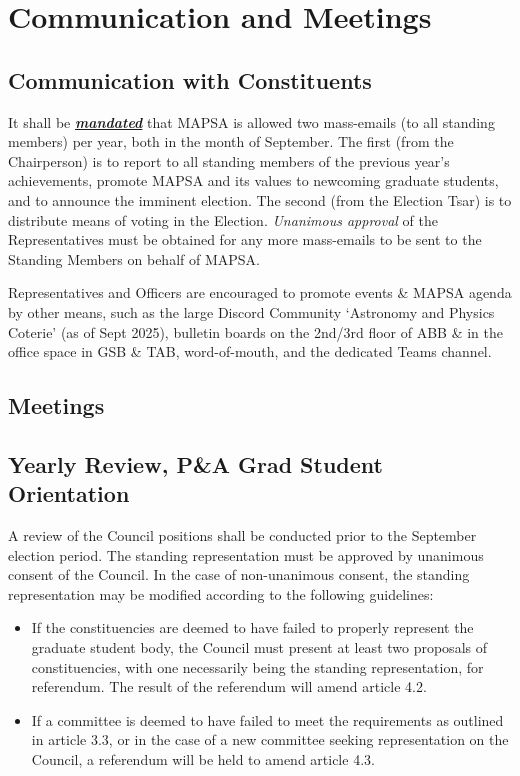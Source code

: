 \documentclass[8pt]{article}
\begin{document}
	
	\section{Communication and Meetings}
	\subsection{Communication with Constituents}
	It shall be \textbf{\textit{\underline{mandated}}} that MAPSA is allowed two mass-emails (to all standing members) per year, both in the month of September. The first (from the Chairperson) is to report to all standing members of the previous year's achievements, promote MAPSA and its values to newcoming graduate students, and to announce the imminent election. The second (from the Election Tsar) is to distribute means of voting in the Election. \textit{Unanimous approval} of the Representatives must be obtained for any more mass-emails to be sent to the Standing Members on behalf of MAPSA.
	
	Representatives and Officers are encouraged to promote events \& MAPSA agenda by other means, such as the large Discord Community `Astronomy and Physics Coterie' (as of Sept 2025), bulletin boards on the 2nd/3rd floor of ABB \& in the office space in GSB \& TAB, word-of-mouth, and the dedicated Teams channel.
	
	\subsection{Meetings}
	
	\subsection{Yearly Review, P\&A Grad Student Orientation}
	A review of the Council positions shall be conducted prior to the September election period. The standing representation must be approved by unanimous consent of the Council. In the case of non-unanimous consent, the standing representation may be modified according to the following guidelines:
	\begin{itemize}
		\item If the constituencies are deemed to have failed to properly represent the graduate student body, the Council must present at least two proposals of constituencies, with one necessarily being the standing representation, for referendum. The result of the referendum will amend article 4.2.
		\item If a committee is deemed to have failed to meet the requirements as outlined in article 3.3, or in the case of a new committee seeking representation on the Council, a referendum will be held to amend article 4.3.
	\end{itemize}
\end{document}
